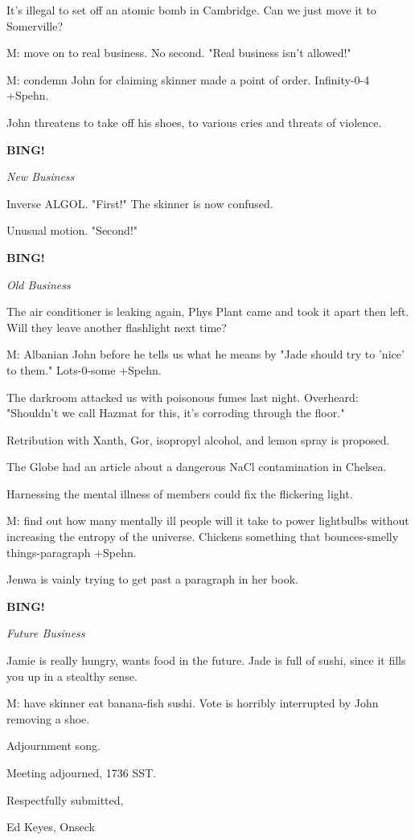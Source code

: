 \documentclass[12pt]{article}
\newcommand{\bing}{{\bf BING!} }
\newcommand{\goto}[1]{\bing \vskip 12pt \centerline{{\em{#1}}}}
\begin{document}
It's illegal to set off an atomic bomb in Cambridge. Can we just move it to Somerville?

M: move on to real business. No second. "Real business isn't allowed!"

M: condemn John for claiming skinner made a point of order. Infinity-0-4 +Spehn.

John threatens to take off his shoes, to various cries and threats of violence.

\goto{New Business}

Inverse ALGOL. "First!" The skinner is now confused.

Unusual motion. "Second!"

\goto{Old Business}

The air conditioner is leaking again, Phys Plant came and took it apart then left. Will they leave another flashlight next time?

M: Albanian John before he tells us what he means by "Jade should try to 'nice' to them." Lots-0-some +Spehn.

The darkroom attacked us with poisonous fumes last night. Overheard: "Shouldn't we call Hazmat for this, it's corroding through the floor."

Retribution with Xanth, Gor, isopropyl alcohol, and lemon spray is proposed.

The Globe had an article about a dangerous NaCl contamination in Chelsea.

Harnessing the mental illness of members could fix the flickering light.

M: find out how many mentally ill people will it take to power lightbulbs without increasing the entropy of the universe. Chickens something that bounces-smelly things-paragraph +Spehn.

Jenwa is vainly trying to get past a paragraph in her book.

\goto{Future Business}

Jamie is really hungry, wants food in the future. Jade is full of sushi, since it fills you up in a stealthy sense.

M: have skinner eat banana-fish sushi. Vote is horribly interrupted by John removing a shoe.

Adjournment song.

\vspace{12pt}

\noindent
Meeting adjourned, 1736 SST.

\vspace{18pt}

\centerline{Respectfully submitted,}
\centerline{Ed Keyes, Onseck}
\end{document}
